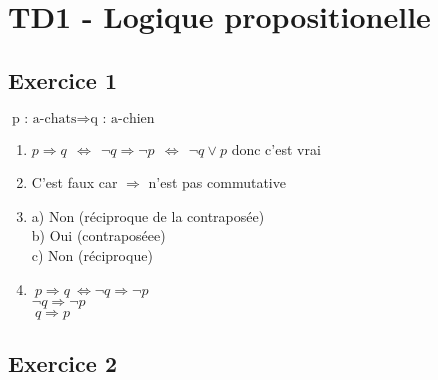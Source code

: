 \documentclass[a4paper, draft]{article}
\begin{document}
\section*{TD1 - Logique propositionelle}

\subsection*{Exercice 1}
$\text{p : a-chats}\Longrightarrow\text{q : a-chien}$\\
\begin{enumerate}
  \item $p\Longrightarrow q \ \ \iff \ \ \lnot q \Longrightarrow \lnot p \ \ \iff \ \ \lnot q \lor p$ donc c'est vrai\\

  \item C'est faux car $\Longrightarrow$ n'est pas commutative\\

  \item a) Non (réciproque de la contraposée)\\
    b) Oui (contraposéee)\\
    c) Non (réciproque)\\

  \item  $\ p\Longrightarrow q \ \iff \lnot q \Longrightarrow \lnot p$ \\
    $\lnot q\Longrightarrow \lnot p $ \\
     $\ q \Longrightarrow p $
\end{enumerate}


\subsection*{Exercice 2}
\end{document}
